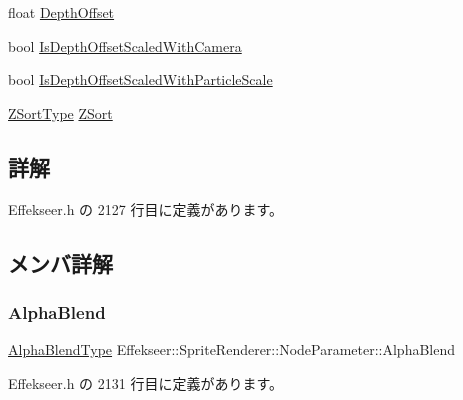 \begin{DoxyCompactItemize}
\item 
float \mbox{\hyperlink{struct_effekseer_1_1_sprite_renderer_1_1_node_parameter_a84a2261f63b8e81c72969ee5c0a5b2c8}{Depth\+Offset}}
\item 
bool \mbox{\hyperlink{struct_effekseer_1_1_sprite_renderer_1_1_node_parameter_a9df806e7ba3cb6d5da9399a03a7864af}{Is\+Depth\+Offset\+Scaled\+With\+Camera}}
\item 
bool \mbox{\hyperlink{struct_effekseer_1_1_sprite_renderer_1_1_node_parameter_a090334edbb3bc3fa04ff63f0443679f7}{Is\+Depth\+Offset\+Scaled\+With\+Particle\+Scale}}
\item 
\mbox{\hyperlink{namespace_effekseer_a7a8ec04f4de0308b5fdb7d66675bddaf}{Z\+Sort\+Type}} \mbox{\hyperlink{struct_effekseer_1_1_sprite_renderer_1_1_node_parameter_ac565028a6b9d045e4220676ef2e4e0d0}{Z\+Sort}}
\end{DoxyCompactItemize}


\subsection{詳解}


 Effekseer.\+h の 2127 行目に定義があります。



\subsection{メンバ詳解}
\mbox{\label{struct_effekseer_1_1_sprite_renderer_1_1_node_parameter_a1b14867e8d71ab1836d732866df2c973}} 
\subsubsection{\texorpdfstring{Alpha\+Blend}{AlphaBlend}}
{\footnotesize\ttfamily \mbox{\hyperlink{namespace_effekseer_a8c32fd5b7ec7feed73314b2ae8086949}{Alpha\+Blend\+Type}} Effekseer\+::\+Sprite\+Renderer\+::\+Node\+Parameter\+::\+Alpha\+Blend}



 Effekseer.\+h の 2131 行目に定義があります。

\mbox{\label{struct_effekseer_1_1_sprite_renderer_1_1_node_parameter_afdff1396f25b0c387eb5a57580364ba0}} 

